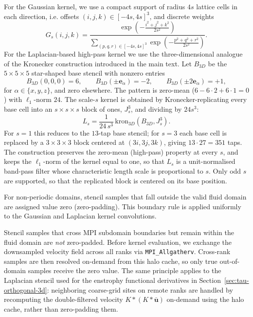 \documentclass[]{elsarticle}
\begin{document}
For the Gaussian kernel, we use a compact support of radius $4s$ lattice cells in each direction, i.e. offsets $(i,j,k) \in [-4s,4s]^3$, and discrete weights
\begin{equation}
    G_s(i,j,k) = \frac{\exp\left(-\frac{i^2+j^2+k^2}{2s^2}\right)}{\sum_{(p,q,r)\in[-4s,4s]^3}\exp\left(-\frac{p^2+q^2+r^2}{2s^2}\right)}.
\end{equation}
For the Laplacian-based high-pass kernel we use the three-dimensional analogue of the Kronecker construction introduced in the main text. Let $B_{3D}$ be the $5 \times 5 \times 5$ star-shaped base stencil with nonzero entries
\begin{equation}
    B_{3D}(0,0,0) = 6, \qquad
    B_{3D}(\pm\boldsymbol{e}_\alpha) = -2, \qquad
    B_{3D}(\pm 2\boldsymbol{e}_\alpha) = +1,
\end{equation}
for $\alpha \in \{x,y,z\}$, and zero elsewhere. The pattern is zero-mean ($6 - 6\cdot 2 + 6\cdot 1 = 0$) with $\ell_1$-norm $24$. The scale-$s$ kernel is obtained by Kronecker-replicating every base cell into an $s\times s \times s$ block of ones, $J_s^3$, and dividing by $24 s^3$:
\begin{equation}
    L_s = \frac{1}{24\, s^3} \, \mathrm{kron}_{3D}\!\left(B_{3D}, J_s^3\right).
\end{equation}
For $s = 1$ this reduces to the $13$-tap base stencil; for $s = 3$ each base cell is replaced by a $3\times 3\times 3$ block centered at $(3i, 3j, 3k)$, giving $13 \cdot 27 = 351$ taps. The construction preserves the zero-mean (high-pass) property at every $s$, and keeps the $\ell_1$-norm of the kernel equal to one, so that $L_s$ is a unit-normalised band-pass filter whose characteristic length scale is proportional to $s$. Only odd $s$ are supported, so that the replicated block is centered on its base position.

For non-periodic domains, stencil samples that fall outside the valid fluid domain are assigned value zero (zero-padding). This boundary rule is applied uniformly to the Gaussian and Laplacian kernel convolutions.

Stencil samples that cross MPI subdomain boundaries but remain within the fluid domain are \emph{not} zero-padded. Before kernel evaluation, we exchange the downsampled velocity field across all ranks via \texttt{MPI\_Allgatherv}. Cross-rank samples are then resolved on-demand from this halo cache, so only true out-of-domain samples receive the zero value. The same principle applies to the Laplacian stencil used for the enstrophy functional derivatives in Section~\ref{sec:tau-orthogonal-3d}: neighboring coarse-grid sites on remote ranks are handled by recomputing the double-filtered velocity $K*(K*\bar{\boldsymbol{u}})$ on-demand using the halo cache, rather than zero-padding them.
\end{document}
